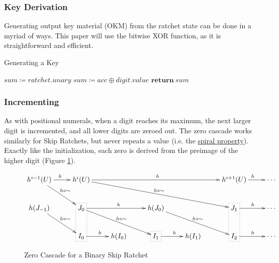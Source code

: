 \documentclass{article}
\begin{document}
	\subsubsection{Key Derivation}

	Generating output key material (OKM) from the ratchet state can be done in a myriad of ways. This paper will use the bitwise \textsf{XOR} function, as it is straightforward and efficient.

	\begin{algorithm}
		\caption{Generating a Key}
		\label{alg:toKey}

		\begin{algorithmic}[1]
				\State $sum \coloneqq ratchet.unary$
					\State $sum \coloneqq acc \oplus digit.value$
				\EndFor
				\State $\textbf{return}\ sum$
			\EndFunction
		\end{algorithmic}
	\end{algorithm}

	\FloatBarrier
	
	\subsubsection{Incrementing}
	
	As with positional numerals, when a digit reaches its maximum, the next larger digit is incremented, and all lower digits are zeroed out. The zero cascade works similarly for Skip Ratchets, but never repeats a value (i.e. the \hyperref[{spiral-metaphor}]{spiral property}). Exactly like the initialization, each zero is derived from the preimage of the higher digit (Figure \ref{fig:zero-cascade}).
	
	\begin{figure}[h]
		\centering
		
		$\xymatrix{
		  h^{i-1}(U)
					\ar[r]^{h}
					\ar[dr]^{h \circ \sim}
				& h^{i}(U)
					\ar[rrrr]^{h}
					\ar[drrrr]^{h \circ \sim}
				&
				&
				&
				& h^{i + 1}(U)
					\ar[r]^{h}
				& \cdots
			\\    h(J_{-1})
					\ar[dr]^{h \circ \sim}
				& J_{0}
					\ar[rr]^{h}
					\ar[drr]^{h \circ \sim}
				&
				& h(J_{0})
					\ar[drr]^{h \circ \sim}
				&
				& J_{1}
					\ar[r]^{h}
				& \cdots
			\\  
				& I_{0}
					\ar[r]^{h}
				& h(I_{0})
				& I_{1}
					\ar[r]^{h}
				& h(I_{1})
				& I_{2}
					\ar[r]^{h}
				& \cdots
			\save
			"2,2" . "3,2" *[F.] \frm{}
			\restore
			\save
			"3,4" . "3,4" *[F.] \frm{}
			\restore
			\save
			"2,6" . "3,6" *[F.] \frm{}
			\restore
		}$
		
		\caption{Zero Cascade for a Binary Skip Ratchet}
		\label{fig:zero-cascade}
	\end{figure}
	
\end{document}
